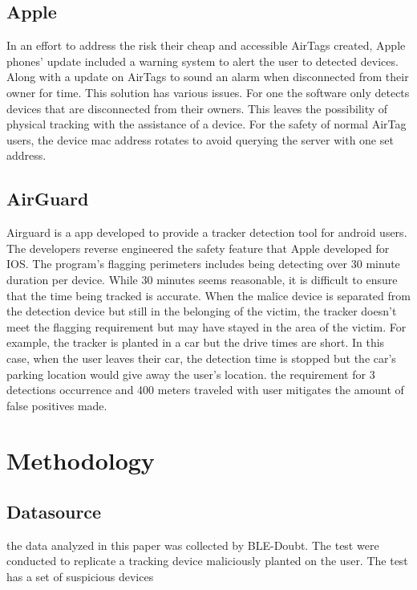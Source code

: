 \documentclass{article}
\begin{document}
\begin{multicols}{2}
\subsection{Apple}
In an effort to address the risk their cheap and accessible AirTags created, Apple phones' update included a warning system to alert the user to detected devices. Along with a update on AirTags to sound an alarm when disconnected from their owner for time. This solution has various issues. For one the software only detects devices that are disconnected from their owners. This leaves the possibility of physical tracking with the assistance of a device. For the safety of  normal AirTag users, the device mac address rotates to avoid querying the server with one set address.
\cite{rescor2023def}


\subsection{AirGuard}

Airguard is a app developed to provide a tracker detection tool for android users. The developers reverse engineered the safety feature that Apple developed for IOS. \cite{heinrich2022airguard} The program's flagging perimeters includes being detecting over 30 minute duration per device. While 30 minutes seems reasonable, it is difficult to ensure that the time being tracked is accurate. When the malice device is separated from the detection device but still in the belonging of the victim, the tracker doesn't meet the flagging requirement but may have stayed in the area of the victim. For example, the tracker is planted in a car but the drive times are short. In this case, when the user leaves their car, the detection time is stopped but the car's parking location would give away the user's location. the requirement for 3 detections occurrence and 400 meters traveled with user mitigates the amount of false positives made.




\section{Methodology}
\subsection{Datasource}
the data analyzed in this paper was collected by BLE-Doubt.\cite{briggs2022ble} The test were conducted to replicate a tracking device maliciously planted on the user. The test has a set of suspicious devices

\end{multicols}
\end{document}
